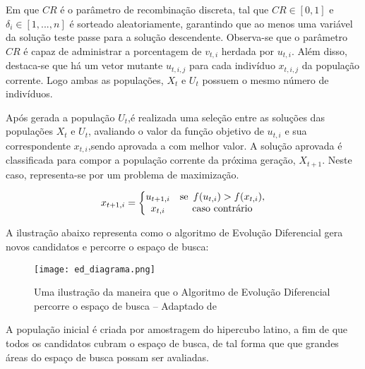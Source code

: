 \documentclass{article}
\begin{document}
Em que $CR$ é o parâmetro de recombinação discreta, tal que $CR \in [0,1]$ e $\delta_i \in [1, ..., n]$ é sorteado aleatoriamente, garantindo que ao menos uma variável da solução teste passe para a solução descendente. Observa-se que o parâmetro $CR$ é capaz de administrar a porcentagem de $v_{t,i}$ herdada por $u_{t,i}$. Além disso, destaca-se que há um vetor mutante $u_{t,i,j}$ para cada indivíduo $x_{t,i,j}$ da população corrente. Logo ambas as populações, $X_t$ e $U_t$ possuem o mesmo número de indivíduos.\newline


Após gerada a população $U_t$,é realizada uma seleção entre as soluções das populações $X_t$ e $U_t$, avaliando o valor da função objetivo de $u_{t,i}$ e sua correspondente $x_{t,i}$,sendo aprovada a com melhor valor. A solução aprovada é classificada para compor a população corrente da próxima geração, $X_{t+1}$.
Neste caso, representa-se por um problema de maximização.

\begin{equation}
\begin{split}
x_{t+1,i} = 
\left\{\begin{matrix}
u_{t+1,i} & \text{se\phantom{0}} f(u_{t,i}) > f(x_{t,i}), \\
x_{t,i} & \text{caso contrário}
\end{matrix}\right.
\end{split}
\end{equation}

A ilustração abaixo representa como o algoritmo de Evolução Diferencial gera novos candidatos e percorre o espaço de busca:

\begin{figure}[H]
  \centering
  \texttt{[image: ed\_diagrama.png]}
  \caption{Uma ilustração da maneira que o Algoritmo de Evolução Diferencial percorre o espaço de busca -- Adaptado de \cite{storn1997differential}}
\end{figure}

A população inicial é criada por amostragem do hipercubo latino, a fim de que todos os candidatos cubram o espaço de busca, de tal forma que que grandes áreas do espaço de busca possam ser avaliadas.
\end{document}
